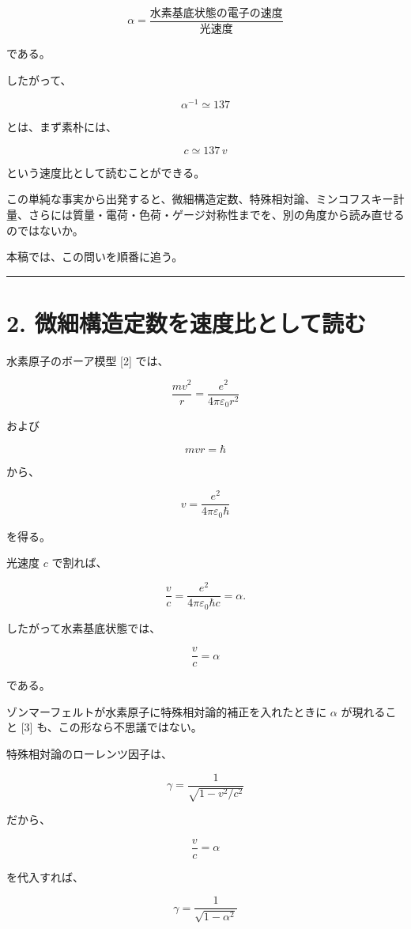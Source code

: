 \documentclass[
  a4paper,
]{ltjsarticle}
\begin{document}
\[
\boxed{\alpha=\frac{\text{水素基底状態の電子の速度}}{\text{光速度}}}
\]

である。

したがって、

\[
\alpha^{-1}\simeq137
\]

とは、まず素朴には、

\[
c\simeq137\,v
\]

という速度比として読むことができる。

この単純な事実から出発すると、微細構造定数、特殊相対論、ミンコフスキー計量、さらには質量・電荷・色荷・ゲージ対称性までを、別の角度から読み直せるのではないか。

本稿では、この問いを順番に追う。

\begin{center}\rule{0.5\linewidth}{0.5pt}\end{center}

\section{2.
微細構造定数を速度比として読む}\label{ux5faeux7d30ux69cbux9020ux5b9aux6570ux3092ux901fux5ea6ux6bd4ux3068ux3057ux3066ux8aadux3080}

水素原子のボーア模型 {[}2{]} では、

\[
\frac{mv^2}{r}
=
\frac{e^2}{4\pi\varepsilon_0r^2}
\]

および

\[
mvr=\hbar
\]

から、

\[
v=
\frac{e^2}{4\pi\varepsilon_0\hbar}
\]

を得る。

光速度 \(c\) で割れば、

\[
\frac vc
=
\frac{e^2}{4\pi\varepsilon_0\hbar c}
=\alpha.
\]

したがって水素基底状態では、

\[
\boxed{\frac vc=\alpha}
\]

である。

ゾンマーフェルトが水素原子に特殊相対論的補正を入れたときに \(\alpha\)
が現れること {[}3{]} も、この形なら不思議ではない。

特殊相対論のローレンツ因子は、

\[
\gamma=
\frac1{\sqrt{1-v^2/c^2}}
\]

だから、

\[
\frac vc=\alpha
\]

を代入すれば、

\[
\gamma=
\frac1{\sqrt{1-\alpha^2}}
\]
\end{document}
